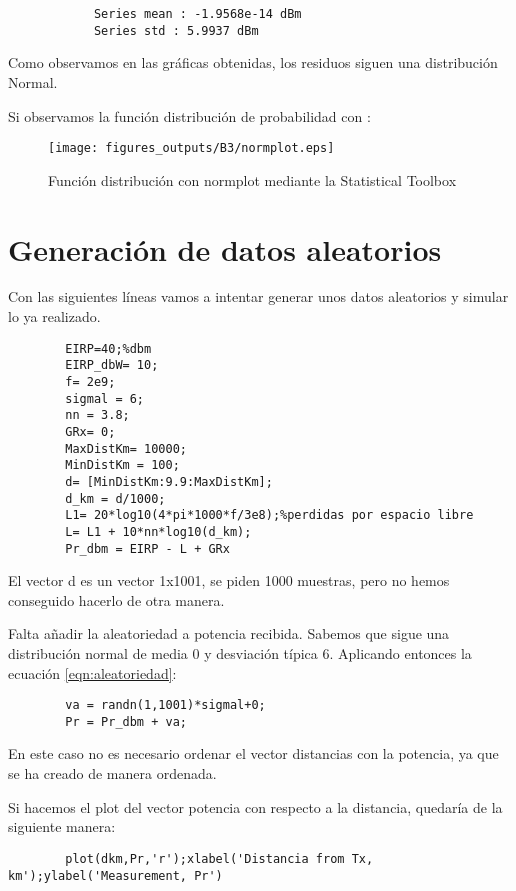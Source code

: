 \documentclass{article}
\begin{document}
        \begin{verbatim}
            Series mean : -1.9568e-14 dBm
            Series std : 5.9937 dBm
        \end{verbatim}
    \par Como observamos en las gráficas obtenidas, los residuos siguen una distribución Normal.
    \par Si observamos la función distribución de probabilidad con :
    \begin{figure}[h]
        \centering
        \texttt{[image: figures\_outputs/B3/normplot.eps]}
        \caption{Función distribución con normplot mediante la Statistical Toolbox}
        \label{fig:my_label}
    \end{figure}
    \clearpage
\section{Generación de datos aleatorios}
    \par Con las siguientes líneas vamos a intentar generar unos datos aleatorios y simular lo ya realizado.
    \begin{lstlisting}
        EIRP=40;%dbm
        EIRP_dbW= 10;
        f= 2e9;
        sigmal = 6;
        nn = 3.8;
        GRx= 0;
        MaxDistKm= 10000;
        MinDistKm = 100;
        d= [MinDistKm:9.9:MaxDistKm];
        d_km = d/1000;
        L1= 20*log10(4*pi*1000*f/3e8);%perdidas por espacio libre
        L= L1 + 10*nn*log10(d_km);
        Pr_dbm = EIRP - L + GRx
    \end{lstlisting}
    \par El vector d es un vector 1x1001, se piden 1000 muestras, pero no hemos conseguido hacerlo de otra manera.
    \par Falta añadir la aleatoriedad a potencia recibida. Sabemos que sigue una distribución normal de media 0 y desviación típica 6. Aplicando entonces la ecuación \ref{eqn:aleatoriedad}:
    \begin{lstlisting}
        va = randn(1,1001)*sigmal+0;
        Pr = Pr_dbm + va;
    \end{lstlisting}
    \par En este caso no es necesario ordenar el vector distancias con la potencia, ya que se ha creado de manera ordenada. 
    \par Si hacemos el plot del vector potencia con respecto a la distancia, quedaría de la siguiente manera:
    \begin{lstlisting}
        plot(dkm,Pr,'r');xlabel('Distancia from Tx, km');ylabel('Measurement, Pr')
    \end{lstlisting}
\end{document}
